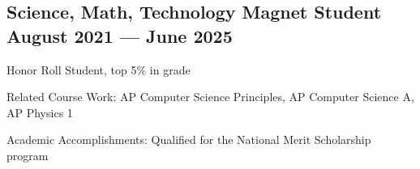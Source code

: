
\subsection{{Science, Math, Technology Magnet Student \hfill August 2021 --- June 2025}}
\begin{zitemize}
\item Honor Roll Student, top 5\% in grade
\item Related Course Work: AP Computer Science Principles, AP Computer Science A, AP Physics 1
\item Academic Accomplishments: Qualified for the National Merit Scholarship program
\end{zitemize}




